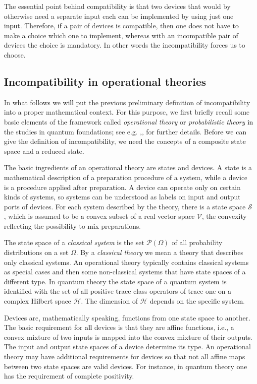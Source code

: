 \documentclass[12pt]{iopart}
\theoremstyle{definition}
\newcommand{\hi}{\mathcal{H}} %
\begin{document}
The essential point behind compatibility is that two devices that would by otherwise need a separate input each can be implemented by using just one input.  
Therefore, if a pair of devices is compatible, then one does not have to make a choice which one to implement, whereas with an incompatible pair of devices the choice is mandatory. In other words the incompatibility forces us to choose. 


\subsection{Incompatibility in operational theories}\label{sec:definition}

In what follows we will put the previous preliminary definition of incompatibility into a proper mathematical context. For this purpose, we first briefly recall some basic elements of the framework called \emph{operational theory} or \emph{probabilistic theory} in the studies in quantum foundations; see e.g. \cite{BaBaLeWi07},\cite{ChDaPe10},\cite{StBu14} for further details.
Before we can give the definition of incompatibility, we need the concepts of a composite state space and a reduced state.

The basic ingredients of an operational theory are states and devices.
A state is a mathematical description of a preparation procedure of a system, while a device is a procedure applied after preparation. 
A device can operate only on certain kinds of systems, so systems can be understood as labels on input and output ports of devices. 
For each system described by the theory, there is a state space $\mathcal{S}$, which is assumed to be a convex subset of a real vector space $\mathcal{V}$, the convexity reflecting the possibility to mix preparations.

The state space of a \emph{classical system} is the set $\mathcal{P}(\Omega)$ of all probability distributions on a set $\Omega$. 
By a \emph{classical theory} we mean a theory that describes only classical systems.
An operational theory typically contains classical systems as special cases and then some non-classical systems that have state spaces of a different type.
In quantum theory the state space of a quantum system is identified with the set of all positive trace class operators of trace one on a complex Hilbert space $\hi$. 
The dimension of $\hi$ depends on the specific system.

Devices are, mathematically speaking, functions from one state space to another.
The basic requirement for all devices is that they are affine functions, i.e., a convex mixture of two inputs is mapped into the convex mixture of their outputs. 
The input and output state spaces of a device determine its type. 
An operational theory may have additional requirements for devices so that not all affine maps between two state spaces are valid devices. 
For instance, in quantum theory one has the requirement of complete positivity.
\end{document}
